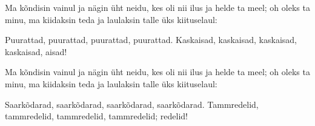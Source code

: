 Ma k\~ondisin vainul ja n\"agin \"uht neidu,
kes oli nii ilus ja helde ta meel;
oh oleks ta minu, ma kiidaksin teda
ja laulaksin talle \"uks kiituselaul:

Puurattad, puurattad, puurattad, puurattad.
Kaskaisad, kaskaisad, kaskaisad, kaskaisad,
aisad!

Ma k\~ondisin vainul ja n\"agin \"uht neidu,
kes oli nii ilus ja helde ta meel;
oh oleks ta minu, ma kiidaksin teda
ja laulaksin talle \"uks kiituselaul:

Saark\~odarad, saark\~odarad, saark\~odarad, saark\~odarad.
Tammredelid, tammredelid, tammredelid, tammredelid;
redelid!